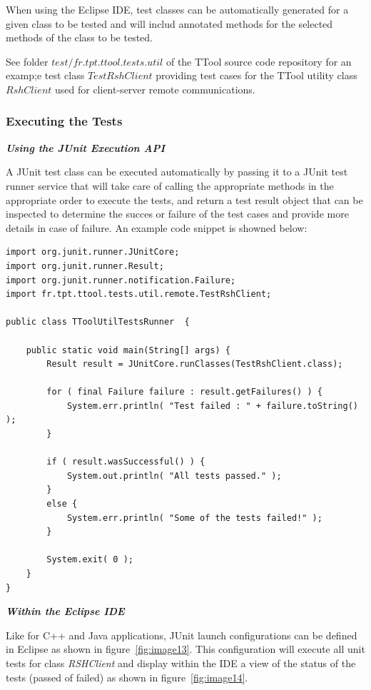 \documentclass[12pt]{article}
\begin{document}
When using the Eclipse IDE, test classes can be automatically generated for a
given class to be tested and will includ annotated methods for the selected
methods of the class to be tested.

See folder $test/fr.tpt.ttool.tests.util$ of the TTool source code repository
for an examp;e test class $TestRshClient$ providing test cases for the TTool
utility class $RshClient$ used for client-server remote communications.

\subsubsection{Executing the Tests}

\textbf{\emph{Using the JUnit Execution API}}

A JUnit test class can be executed automatically by passing
it to a JUnit test runner service that will take care of calling the appropriate
methods in the appropriate order to execute the tests, and return a test result
object that can be inspected to determine the succes or failure of the test
cases and provide more details in case of failure. An example code snippet is
showned below:

\begin{verbatim}
import org.junit.runner.JUnitCore;
import org.junit.runner.Result;
import org.junit.runner.notification.Failure;
import fr.tpt.ttool.tests.util.remote.TestRshClient;

public class TToolUtilTestsRunner  {

    public static void main(String[] args) {
        Result result = JUnitCore.runClasses(TestRshClient.class);

        for ( final Failure failure : result.getFailures() ) { 
            System.err.println( "Test failed : " + failure.toString() );
        }
 		
        if ( result.wasSuccessful() ) {
            System.out.println( "All tests passed." );
        }
        else {
            System.err.println( "Some of the tests failed!" );
        }
 
        System.exit( 0 );
    }
}
\end{verbatim}

\textbf{\emph{Within the Eclipse IDE}}

Like for C++ and Java applications, JUnit launch configurations can be defined
in Eclipse as shown in figure~\ref{fig:image13}. This configuration will execute all unit tests
for class \textit{RSHClient} and display within the IDE a view of the status of
the tests (passed of failed) as shown in figure~\ref{fig:image14}.
\end{document}
